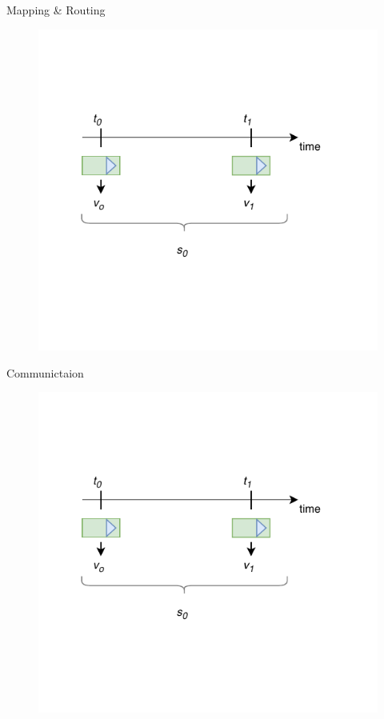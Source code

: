 \documentclass{beamer}
\begin{document}
\begin{frame}{Mapping \& Routing}
\begin{figure}
\begin{overprint}
	\includegraphics[page=15,scale=1]{sources/Rounting_1.pdf}
\end{overprint}
\end{figure}
\end{frame}

\begin{frame}{Communictaion}
	\centering
	\begin{figure}
		\includegraphics[page=11,scale=0.8]{sources/Rounting_1.pdf}
	\end{figure}
\end{frame}
\end{document}
